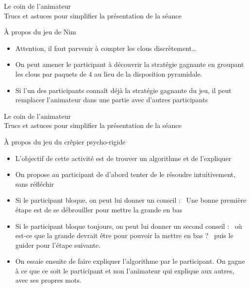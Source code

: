 \documentclass[final,hyperref={pdfpagelabels=false}]{beamer}
\renewcommand*{\large}{\fontsize{\resultlargeX}{\resultlargeY}\selectfont}
\begin{document}
\begin{frame}{Le coin de l'animateur\\[-5pt]
  {\large Trucs et astuces pour simplifier la présentation de la séance}}
\begin{block}{À propos du jeu de Nim}
\begin{itemize}
      stratégie gagnante, il faut proposer un match en 3 (ou en 5 en cas de
      coup dur ;)
    \item Attention, il faut parvenir à compter les clous discrètement\ldots
    \item On peut amener le participant à découvrir la stratégie gagnante en
      groupant les clous par paquets de 4 au lieu de la disposition pyramidale.
    \item Si l'un des participants connaît déjà la stratégie gagnante du jeu,
      il peut remplacer l'animateur dans une partie avec d'autres participants
    \end{itemize}    
  \end{block}
\end{frame}

\begin{frame}{Le coin de l'animateur\\[-5pt]
  {\large Trucs et astuces pour simplifier la présentation de la séance}}
  \begin{block}{À propos du jeu du crêpier psycho-rigide}
    \begin{itemize}
    \item L'objectif de cette activité est de trouver un algorithme et de
    l'expliquer 
    \item On propose au participant de d'abord tenter de le résoudre
    intuitivement, sans réfléchir
    \item Si le participant bloque, on peut lui donner un conseil : \og~Une
    bonne première étape est de se débrouiller pour mettre la grande en bas~\fg
    \item Si le participant bloque toujours, on peut lui donner un second
    conseil : \og~où est-ce que la grande devrait être pour pouvoir la mettre en
    bas ? ~\fg puis le guider pour l'étape suivante.
    \item On essaie ensuite de faire expliquer l'algorithme par le participant.
    On gagne à ce que ce soit le participant et non l'animateur qui explique aux
    autres, avec ses propres mots.
    \end{itemize}    
  \end{block}

\end{frame}
\end{document}
